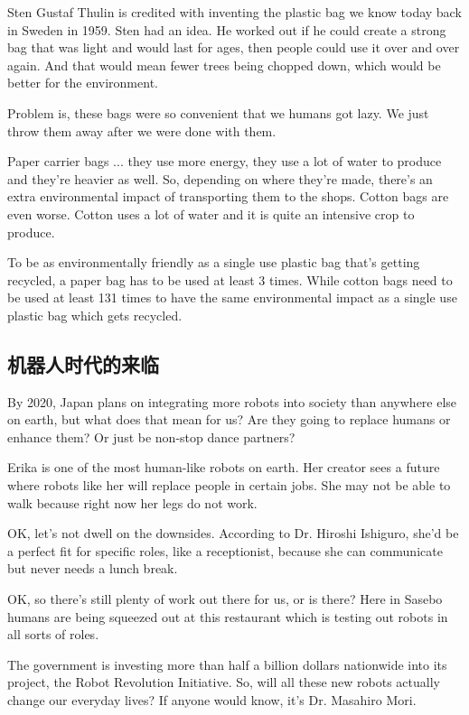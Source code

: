 Sten Gustaf Thulin is credited with inventing the plastic bag we know today back in Sweden in 1959. Sten had an idea. He worked out if he could create a strong bag that was light and would last for ages, then people could use it over and over again. And that would mean fewer trees being chopped down, which would be better for the environment.

Problem is, these bags were so convenient that we humans got lazy. We just throw them away after we were done with them.

Paper carrier bags ... they use more energy, they use a lot of water to produce and they're heavier as well. So, depending on where they're made, there's an extra environmental impact of transporting them to the shops. Cotton bags are even worse. Cotton uses a lot of water and it is quite an intensive crop to produce.

To be as environmentally friendly as a single use plastic bag that's getting recycled, a paper bag has to be used at least 3 times. While cotton bags need to be used at least 131 times to have the same environmental impact as a single use plastic bag which gets recycled.

\subsection{机器人时代的来临}
By 2020, Japan plans on integrating more robots into society than anywhere else on earth, but what does that mean for us? Are they going to replace humans or enhance them? Or just be non-stop dance partners?

Erika is one of the most human-like robots on earth. Her creator sees a future where robots like her will replace people in certain jobs. She may not be able to walk because right now her legs do not work.

OK, let's not dwell on the downsides. According to Dr. Hiroshi Ishiguro, she'd be a perfect fit for specific roles, like a receptionist, because she can communicate but never needs a lunch break.

OK, so there's still plenty of work out there for us, or is there? Here in Sasebo humans are being squeezed out at this restaurant which is testing out robots in all sorts of roles.

The government is investing more than half a billion dollars nationwide into its project, the Robot Revolution Initiative. So, will all these new robots actually change our everyday lives? If anyone would know, it's Dr. Masahiro Mori.

